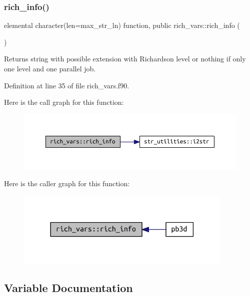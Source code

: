 \subsubsection{\texorpdfstring{rich\+\_\+info()}{rich\_info()}}
{\footnotesize\ttfamily elemental character(len=max\+\_\+str\+\_\+ln) function, public rich\+\_\+vars\+::rich\+\_\+info (\begin{DoxyParamCaption}{ }\end{DoxyParamCaption})}



Returns string with possible extension with Richardson level or nothing if only one level and one parallel job. 



Definition at line 35 of file rich\+\_\+vars.\+f90.

Here is the call graph for this function\+:\nopagebreak
\begin{figure}[H]
\begin{center}
\leavevmode
\includegraphics[width=350pt]{namespacerich__vars_a4f54d3fc0ac510fc073220794ee4fa37_cgraph}
\end{center}
\end{figure}
Here is the caller graph for this function\+:\nopagebreak
\begin{figure}[H]
\begin{center}
\leavevmode
\includegraphics[width=294pt]{namespacerich__vars_a4f54d3fc0ac510fc073220794ee4fa37_icgraph}
\end{center}
\end{figure}


\subsection{Variable Documentation}
\mbox{\label{namespacerich__vars_af3df7361e33058bc83fe43a803173d89}} 
